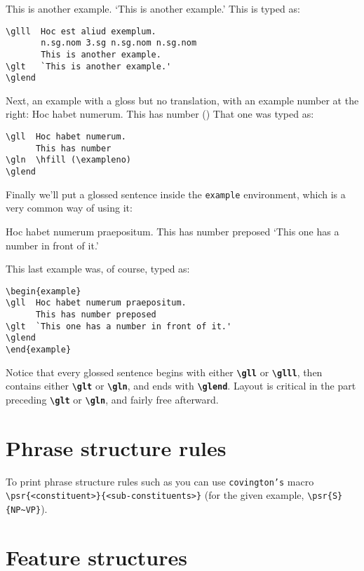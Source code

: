 \documentclass[english]{article}
\newcommand*\jmacro[1]{\textbf{\texttt{#1}}}
\newcommand*\jcsmacro[1]{\jmacro{\textbackslash{#1}}}
\begin{document}
       This is another example.
\glt   `This is another example.'
\glend
This is typed as:
\begin{lstlisting}[moretexcs={glll,glt,glend}]
\glll  Hoc est aliud exemplum.
       n.sg.nom 3.sg n.sg.nom n.sg.nom
       This is another example.
\glt   `This is another example.'
\glend
\end{lstlisting}
Next, an example with a gloss but no translation, with an example number 
at the right:
\gll  Hoc habet numerum.
      This has number
\gln  \hfill (\exampleno)
\glend
That one was typed as:
\begin{lstlisting}[moretexcs={gll,gln,glend,exampleno}]
\gll  Hoc habet numerum.
      This has number
\gln  \hfill (\exampleno)
\glend
\end{lstlisting}
Finally we'll put a glossed sentence inside the \texttt{example} 
environment, which is a very common way of using it:
\begin{example}
\gll  Hoc habet numerum praepositum.
      This has number preposed
\glt  `This one has a number in front of it.'
\glend
\end{example}
This last example was, of course, typed as:
\begin{lstlisting}[moretexcs={gll,glt,glend}]
\begin{example}
\gll  Hoc habet numerum praepositum.
      This has number preposed
\glt  `This one has a number in front of it.'
\glend
\end{example}
\end{lstlisting}
Notice that every glossed sentence begins with either \jcsmacro{gll} or 
\jcsmacro{glll}, then contains either \jcsmacro{glt} or \jcsmacro{gln}, and ends 
with \jcsmacro{glend}.  Layout is critical in the part preceding 
\jcsmacro{glt} or \jcsmacro{gln}, and fairly free afterward.

\section{Phrase structure rules}

To print phrase structure rules such as  you can use \texttt{covington's} macro
\lstinline[moretexcs={psr}]"\psr{<constituent>}{<sub-constituents>}" (for the given example,
\lstinline[moretexcs={psr}]"\psr{S}{NP~VP}").

\section{Feature structures}
\end{document}
